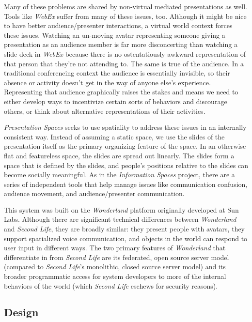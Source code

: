 Many of these problems are shared by non-virtual mediated presentations as well. Tools like \emph{WebEx} suffer from many of these issues, too. Although it might be nice to have better audience/presenter interactions, a virtual world context forces these issues. Watching an un-moving avatar representing someone giving a presentation as an audience member is far more disconcerting than watching a slide deck in \emph{WebEx} because there is no ostentatiously awkward representation of that person that they're not attending to. The same is true of the audience. In a traditional conferencing context the audience is essentially invisible, so their absence or activity doesn't get in the way of anyone else's experience. Representing that audience graphically raises the stakes and means we need to either develop ways to incentivize certain sorts of behaviors and discourage others, or think about alternative representations of their activities. 

\emph{Presentation Spaces} seeks to use spatiality to address these issues in an internally consistent way. Instead of assuming a static space, we use the slides of the presentation itself as the primary organizing feature of the space. In an otherwise flat and featureless space, the slides are spread out linearly. The slides form a space that is defined by the slides, and people's positions relative to the slides can become socially meaningful. As in the \emph{Information Spaces} project, there are a series of independent tools that help manage issues like communication confusion, audience movement, and audience/presenter communication. 

This system was built on the \emph{Wonderland} platform \citep{Kaplan:2011en} originally developed at Sun Labs. Although there are significant technical differences between \emph{Wonderland} and \emph{Second Life}, they are broadly similar: they present people with avatars, they support spatialized voice communication, and objects in the world can respond to user input in different ways. The two primary features of \emph{Wonderland} that differentiate in from \emph{Second Life} are its federated, open source server model (compared to \emph{Second Life}'s monolithic, closed source server model) and its broader programmatic access for system developers to more of the internal behaviors of the world (which \emph{Second Life} eschews for security reasons). 


\subsection{Design}

